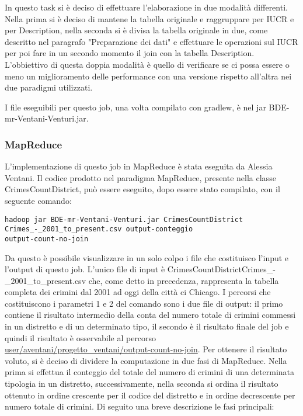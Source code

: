 \documentclass[10pt]{article}
\begin{document}
In questo task si è deciso di effettuare l'elaborazione in due modalità differenti. Nella prima si è deciso di mantene la tabella originale e raggruppare per IUCR e per Description, nella seconda si è divisa la tabella originale in due, come descritto nel paragrafo "Preparazione dei dati" e effettuare le operazioni sul IUCR per poi fare in un secondo momento il join con la tabella Description.\\
L'obbiettivo di questa doppia modalità è quello di verificare se ci possa essere o meno un miglioramento delle performance con una versione rispetto all'altra nei due paradigmi utilizzati.

I file eseguibili per questo job, una volta compilato con gradlew, è nel jar BDE-mr-Ventani-Venturi.jar. 


\subsubsection{MapReduce}
L'implementazione di questo job in MapReduce è stata eseguita da Alessia Ventani.
Il codice prodotto nel paradigma MapReduce, presente nella classe CrimesCountDistrict, può essere eseguito, dopo essere stato compilato, con il seguente comando:
\begin{lstlisting}
hadoop jar BDE-mr-Ventani-Venturi.jar CrimesCountDistrict 
Crimes_-_2001_to_present.csv output-conteggio  
output-count-no-join
\end{lstlisting}
Da questo è possibile visualizzare in un solo colpo i file che costituisco l'input e l'output di questo job. L'unico file di input è CrimesCountDistrictCrimes\_-\_2001\_to\_present.csv che, come detto in precedenza, rappresenta la tabella completa dei crimini dal 2001 ad oggi della città ci Chicago. I percorsi che costituiscono i parametri 1 e 2 del comando sono i due file di output: il primo contiene il risultato intermedio della conta del numero totale di crimini commessi in un distretto e di un determinato tipo, il secondo è il risultato finale del job e quindi il risultato è osservabile al percorso \url{user/aventani/progetto_ventani/output-count-no-join}.
Per ottenere il risultato voluto, si è deciso di dividere la computazione in due fasi di MapReduce. Nella prima si effettua il conteggio del totale del numero di crimini di una determinata tipologia in un distretto, successivamente, nella seconda si ordina il risultato ottenuto in ordine crescente per il codice del distretto e in ordine decrescente per numero totale di crimini.
Di seguito una breve descrizione le fasi principali:
\end{document}

